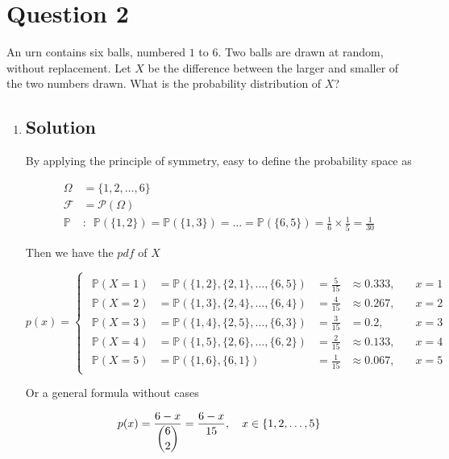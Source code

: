 \documentclass[12pt]{article}
\newcommand{\bP}{\mathbb{P}}
\begin{document}
	
	\section*{Question 2}
	
	\noindent An urn contains six balls, numbered $1$ to $6$. Two balls are drawn at random, without replacement. Let $X$ be the difference between the larger and smaller of the two numbers drawn. What is the probability distribution of $X$?
	
	\bigskip
	
	\begin{enumerate}[label={},leftmargin=0in]\item
		\subsection*{Solution}
		
			By applying the principle of symmetry, easy to define the probability space as
			
			\[
			\begin{aligned}
				\Omega &= \{1,2,\dots,6\}\\
				\mathcal{F} &= \mathcal{P}(\Omega)\\
				\bP &:\enspace \bP(\{1,2\}) = \bP(\{1,3\}) = \dots = \bP(\{6,5\}) = \frac{1}{6}\times \frac{1}{5} = \frac{1}{30}
			\end{aligned}
			\]
			
			Then we have the $pdf$ of $X$
			
			\[
				p(x) =
				\begin{cases}
					\begin{aligned}
						\bP(X = 1) &= \bP(\{1,2\},\{2,1\},\dots,\{6,5\}) &= \frac{5}{15} &\approx 0.333,&\quad x = 1\\
						\bP(X = 2) &= \bP(\{1,3\},\{2,4\},\dots,\{6,4\}) &= \frac{4}{15} &\approx 0.267,&\quad x = 2\\
						\bP(X = 3) &= \bP(\{1,4\},\{2,5\},\dots,\{6,3\}) &= \frac{3}{15} &= 0.2,&\quad x = 3\\
						\bP(X = 4) &= \bP(\{1,5\},\{2,6\},\dots,\{6,2\}) &= \frac{2}{15} &\approx 0.133,&\quad x = 4\\
						\bP(X = 5) &= \bP(\{1,6\},\{6,1\}) &= \frac{1}{15} &\approx 0.067,&\quad x = 5
					\end{aligned}
				\end{cases}
			\]
			
			Or a general formula without cases
			
			\[p(x) = \frac{6-x}{\dbinom{6}{2}} = \frac{6-x}{15},\quad x\in\{1,2,\dots,5\}\]
		

\end{enumerate}
\end{document}
